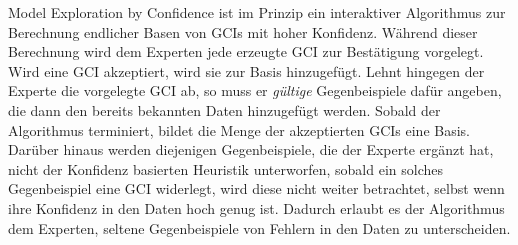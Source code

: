 \documentclass[ngerman,fleqn,DIV=12]{scrartcl}
\begin{document}
Model Exploration by Confidence ist im Prinzip ein interaktiver Algorithmus zur Berechnung
endlicher Basen von GCIs mit hoher Konfidenz.  Während dieser Berechnung wird dem Experten
jede erzeugte GCI zur Bestätigung vorgelegt.  Wird eine GCI akzeptiert, wird sie zur Basis
hinzugefügt.  Lehnt hingegen der Experte die vorgelegte GCI ab, so muss er \emph{gültige}
Gegenbeispiele dafür angeben, die dann den bereits bekannten Daten hinzugefügt werden.
Sobald der Algorithmus terminiert, bildet die Menge der akzeptierten GCIs eine Basis.
Darüber hinaus werden diejenigen Gegenbeispiele, die der Experte ergänzt hat, nicht der
Konfidenz basierten Heuristik unterworfen, \dh sobald ein solches Gegenbeispiel eine GCI
widerlegt, wird diese nicht weiter betrachtet, selbst wenn ihre Konfidenz in den Daten
hoch genug ist.  Dadurch erlaubt es der Algorithmus dem Experten, seltene Gegenbeispiele
von Fehlern in den Daten zu unterscheiden.

\printbibliography{}
\end{document}

